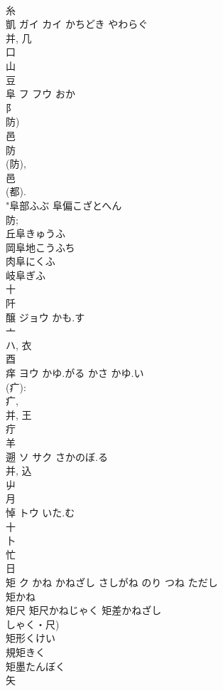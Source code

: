 \documentclass[8pt]{extreport}
\begin{document}
\begin{CJK}{UTF8}{min}
\\	糸 
\\	凱	ガイ カイ	かちどき やわらぐ	
\\	并, 几 
\\	口 
\\	山 
\\	豆 
\\	阜	フ フウ	おか	
\\	阝 
\\	防) 
\\	邑 
\\	防 
\\	(防), 
\\	邑 
\\	(都).
\\	"阜部ふぶ 阜偏こざとへん 
\\	防; 
\\	丘阜きゅうふ 
\\	岡阜地こうふち 
\\	肉阜にくふ 
\\	岐阜ぎふ 
\\	十 
\\	阡	
\\	醸	ジョウ	かも.す	
\\	亠 
\\	ハ, 衣 
\\	酉 
\\	痒	ヨウ	かゆ.がる かさ かゆ.い	
\\	(疒): 
\\	疒, 
\\	并, 王 
\\	疔 
\\	羊 
\\	遡	ソ サク	さかのぼ.る	
\\	并, 込 
\\	屮 
\\	月 
\\	悼	トウ	いた.む	
\\	十 
\\	卜 
\\	忙 
\\	日 
\\	矩	ク	かね かねざし さしがね のり つね ただし	
\\	矩かね 
\\	矩尺 矩尺かねじゃく 矩差かねざし 
\\	しゃく・尺) 
\\	矩形くけい 
\\	規矩きく 
\\	矩墨たんぼく 
\\	矢 

\end{CJK}
\end{document}
